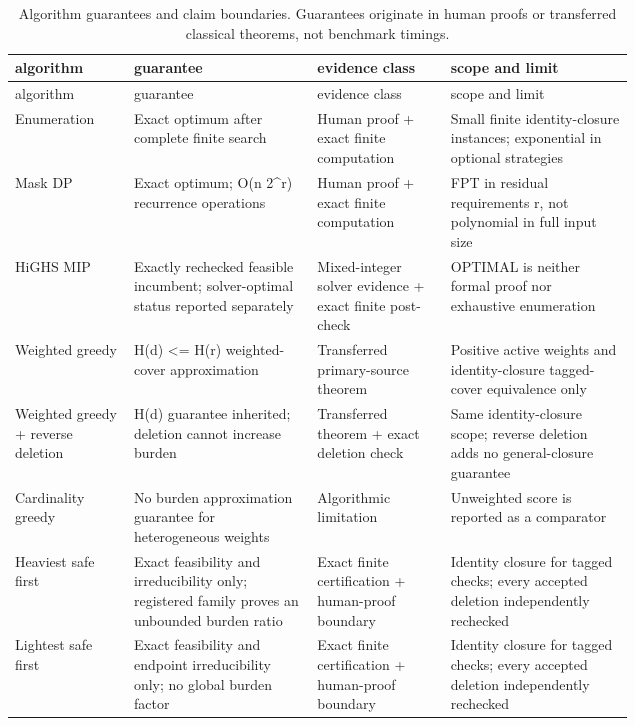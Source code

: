 {\footnotesize
\begin{longtable}{p{0.12\linewidth}p{0.22\linewidth}p{0.16\linewidth}p{0.22\linewidth}}
\caption{Algorithm guarantees and claim boundaries. Guarantees originate in human proofs or transferred classical theorems, not benchmark timings.}\label{tab:aor-algorithm-guarantees}\\
\toprule
algorithm & guarantee & evidence class & scope and limit \\
\midrule
\endfirsthead
\toprule
algorithm & guarantee & evidence class & scope and limit \\
\midrule
\endhead
Enumeration & Exact optimum after complete finite search & Human proof + exact finite computation & Small finite identity-closure instances; exponential in optional strategies \\
Mask DP & Exact optimum; O(n 2\textasciicircum{}r) recurrence operations & Human proof + exact finite computation & FPT in residual requirements r, not polynomial in full input size \\
HiGHS MIP & Exactly rechecked feasible incumbent; solver-optimal status reported separately & Mixed-integer solver evidence + exact finite post-check & OPTIMAL is neither formal proof nor exhaustive enumeration \\
Weighted greedy & H(d) <= H(r) weighted-cover approximation & Transferred primary-source theorem & Positive active weights and identity-closure tagged-cover equivalence only \\
Weighted greedy + reverse deletion & H(d) guarantee inherited; deletion cannot increase burden & Transferred theorem + exact deletion check & Same identity-closure scope; reverse deletion adds no general-closure guarantee \\
Cardinality greedy & No burden approximation guarantee for heterogeneous weights & Algorithmic limitation & Unweighted score is reported as a comparator \\
Heaviest safe first & Exact feasibility and irreducibility only; registered family proves an unbounded burden ratio & Exact finite certification + human-proof boundary & Identity closure for tagged checks; every accepted deletion independently rechecked \\
Lightest safe first & Exact feasibility and endpoint irreducibility only; no global burden factor & Exact finite certification + human-proof boundary & Identity closure for tagged checks; every accepted deletion independently rechecked \\

\end{longtable}}
